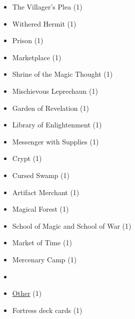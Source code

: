 \begin{multicols}{3}
\begin{itemize}[leftmargin=0pt, label={}, noitemsep, noitemsep]
  \item The Villager's Plea (1)
  \item Withered Hermit (1)
  \item Prison (1)
  \item Marketplace (1)
  \item Shrine of the Magic Thought (1)
  \item Mischievous Leprechaun (1)
  \item Garden of Revelation (1)
  \item Library of Enlightenment (1)
  \item Messenger with Supplies (1)
  \item Crypt (1)
  \item Cursed Swamp (1)
  \item Artifact Merchant (1)
  \item Magical Forest (1)
  \item School of Magic and School of War (1)
  \item Market of Time (1)
  \item Mercenary Camp (1)
  \item
  \item \underline{Other} (1)
  \item Fortress deck cards (1)
\end{itemize}

\end{multicols}
